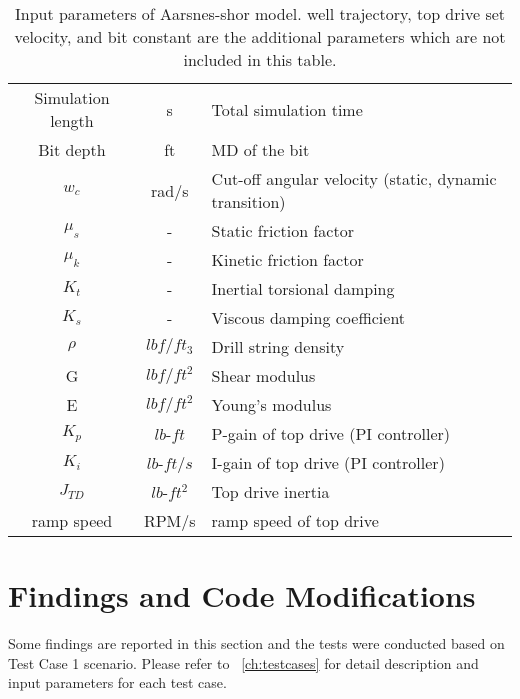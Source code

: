 \begin{table}
\centering
\begin{tabularx}{\linewidth-0.75in}{|c|c|L|}
\hline
{} &  &  \\                                                              
\hline
Simulation length & s & Total simulation time \\                                                  
\hline
Bit depth & ft & MD of the bit \\                                                   
\hline
$w_c$ & rad/s & Cut-off angular velocity (static, dynamic transition)\\                                                              
\hline
$\mu_s$ & -& Static friction factor\\
\hline
$\mu_k$ & - & Kinetic friction factor \\ 
\hline
$K_t$ &- & Inertial torsional damping \\                                                  
\hline
$K_s$ &- & Viscous damping coefficient \\                                                   
\hline
$\rho$ & $lbf/ft_3$ & Drill string density \\                                                       
\hline
G & $lbf/ft^2$ & Shear modulus   \\                                                         
\hline
E & $lbf/ft^2$ & Young's modulus \\                                                              
\hline
$K_p$ & $lb$-$ft$ & P-gain of top drive (PI controller) \\
\hline
$K_i$ & $lb$-$ft/s$ &I-gain of top drive (PI controller)\\ 
\hline
$J_{TD}$ & $lb$-$ft^2$ & Top drive inertia \\
\hline
ramp speed & RPM/s & ramp speed of top drive\\
\hline
\end{tabularx}
\caption[Input parameters of Aarsnes-Shor model (PYTHON ver.)]{Input parameters of Aarsnes-shor model. well trajectory, top drive set velocity, and bit constant are the additional parameters which are not included in this table.}\label{AS_inptut_params}
\end{table}

\section{Findings and Code Modifications}
Some findings are reported in this section and the tests were conducted based on Test Case 1 scenario. Please refer to \chaptername~\ref{ch:testcases} for detail description and input parameters for each test case.

